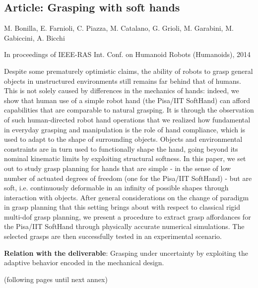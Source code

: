 \documentclass[a4paper,11pt,pdf]{pacmanreport}
\begin{document}
\subsection{Article: Grasping with soft hands} \label{ann:softGrasps}
\begin{description}
    \item[Authors] M. Bonilla, E. Farnioli, C. Piazza, M. Catalano, G. Grioli, M. Garabini, M. Gabiccini, A. Bicchi
    \item[Info] In proceedings of IEEE-RAS Int. Conf. on Humanoid Robots (Humanoids), 2014
    \item[Abstract] Despite some prematurely optimistic claims, the ability of robots to grasp general objects in unstructured environments still remains far behind that of humans. This is not solely caused by differences in the mechanics of hands: indeed, we show that human use of a simple robot hand (the Pisa/IIT SoftHand) can afford capabilities that are comparable to natural grasping. It is through the observation of such human-directed robot hand operations that we realized how fundamental in everyday grasping and manipulation is the role of hand compliance, which is used to adapt to the shape of surrounding objects. Objects and environmental constraints are in turn used to functionally shape the hand, going beyond its nominal kinematic limits by exploiting structural softness. In this paper, we set out to study grasp planning for hands that are simple - in the sense of low number of actuated degrees of freedom (one for the Pisa/IIT SoftHand) - but are soft, i.e. continuously deformable in an infinity of possible shapes through interaction with objects. After general considerations on the change of paradigm in grasp planning that this setting brings about with respect to classical rigid multi-dof grasp planning, we present a procedure to extract grasp affordances for the Pisa/IIT SoftHand through physically accurate numerical simulations. The selected grasps are then successfully tested in an experimental scenario.
    \item \textbf{Relation with the deliverable}: Grasping under uncertainty by exploiting the adaptive behavior encoded in the mechanical design.
    \item[Attachment] (following pages until next annex)
\end{description}

\end{document}
